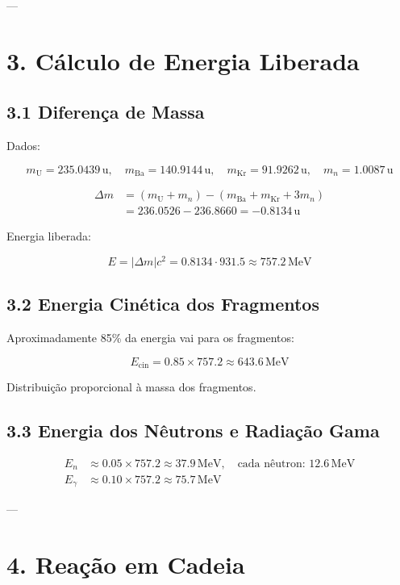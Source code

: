 \documentclass[12pt,a4paper]{article}
\begin{document}
---

\section*{3. Cálculo de Energia Liberada}

\subsection*{3.1 Diferença de Massa}

Dados:

\[
m_\text{U} = 235.0439\,\mathrm{u}, \quad
m_\text{Ba} = 140.9144\,\mathrm{u}, \quad
m_\text{Kr} = 91.9262\,\mathrm{u}, \quad
m_n = 1.0087\,\mathrm{u}
\]

\begin{align*}
\Delta m &= (m_\text{U} + m_n) - (m_\text{Ba} + m_\text{Kr} + 3 m_n) \\
&= 236.0526 - 236.8660 = -0.8134\,\mathrm{u}
\end{align*}

Energia liberada:

\[
E = |\Delta m| c^2 = 0.8134 \cdot 931.5 \approx 757.2 \,\mathrm{MeV}
\]

\subsection*{3.2 Energia Cinética dos Fragmentos}

Aproximadamente 85\% da energia vai para os fragmentos:

\[
E_\text{cin} = 0.85 \times 757.2 \approx 643.6 \,\mathrm{MeV}
\]

Distribuição proporcional à massa dos fragmentos.

\subsection*{3.3 Energia dos Nêutrons e Radiação Gama}

\begin{align*}
E_n &\approx 0.05 \times 757.2 \approx 37.9 \,\mathrm{MeV}, \quad \text{cada nêutron: } 12.6\,\mathrm{MeV} \\
E_\gamma &\approx 0.10 \times 757.2 \approx 75.7 \,\mathrm{MeV}
\end{align*}

---

\section*{4. Reação em Cadeia}
\end{document}
